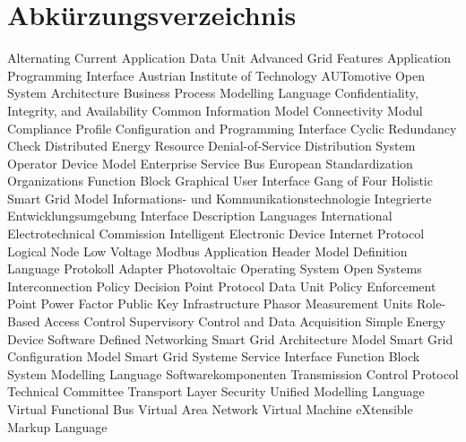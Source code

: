 \chapter*{Abkürzungsverzeichnis}
\pagestyle{plain}

\begin{acronym}[AUTOSAR]

   				{Alternating Current}
  				{Application Data Unit}
  				{Advanced Grid Features}
  				{Application Programming Interface}
  				{Austrian Institute of Technology}
  		{AUTomotive Open System Architecture}
  				{Business Process Modelling Language}
  				{Confidentiality, Integrity, and Availability}
  				{Common Information Model}
   				{Connectivity Modul}
   				{Compliance Profile}
  				{Configuration and Programming Interface}
  				{Cyclic Redundancy Check}
  				{Distributed Energy Resource}
  				{Denial-of-Service}
  				{Distribution System Operator}
   				{Device Model}
  				{Enterprise Service Bus}
  				{European Standardization Organizations}
   				{Function Block}
  				{Graphical User Interface}
  				{Gang of Four}
 			{Holistic Smart Grid Model}
  				{Informations- und Kommunikationstechnologie}
  				{Integrierte Entwicklungsumgebung}
  				{Interface Description Languages}
  				{International Electrotechnical Commission}
  				{Intelligent Electronic Device}
   				{Internet Protocol}
   				{Logical Node}
   				{Low Voltage}
  			{Modbus Application Header}
  				{Model Definition Language}
   				{Protokoll Adapter}
   				{Photovoltaic}
   				{Operating System}
  				{Open Systems Interconnection}
  				{Policy Decision Point}
  				{Protocol Data Unit}
  				{Policy Enforcement Point}
   				{Power Factor}
 				{Public Key Infrastructure}
  				{Phasor Measurement Units}
 			{Role-Based Access Control}
 			{Supervisory Control and Data Acquisition}
  				{Simple Energy Device}
  				{Software Defined Networking}
 			{Smart Grid Architecture Model}
 			{Smart Grid Configuration Model}
  			{Smart Grid Systeme}
 				{Service Interface Function Block}
 			{System Modelling Language}
  			{Softwarekomponenten}
  				{Transmission Control Protocol}
  				{Technical Committee}
  				{Transport Layer Security}
  				{Unified Modelling Language}
  				{Virtual Functional Bus}
 			{Virtual Area Network}
  				{Virtual Machine}
  				{eXtensible Markup Language}
\end{acronym}
